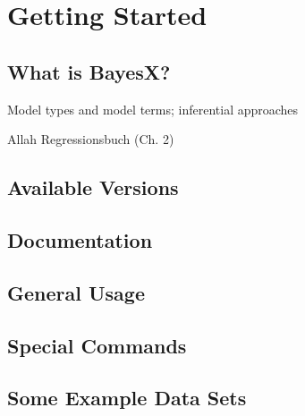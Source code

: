 
\chapter{Getting Started}

\section{What is BayesX?}

Model types and model terms; inferential approaches

Allah Regressionsbuch (Ch. 2)


\section{Available Versions}

\section{Documentation}

\section{General Usage}

\section{Special Commands}

\section{Some Example Data Sets}

